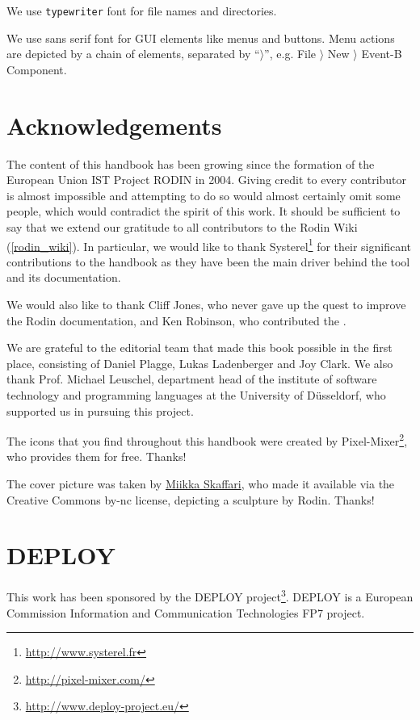 \documentclass[12pt]{book}
\begin{document}
We use \texttt{typewriter} font for file names and directories.

We use \textsf{sans serif font} for GUI elements like menus and buttons.  Menu actions are depicted by a chain of elements, separated by ``$\rangle$'', e.g. \textsf{File $\rangle$ New $\rangle$ Event-B Component}.

\section{Acknowledgements}
\label{sec:acknowledgements}

The content of this handbook has been growing since the formation of the European Union IST Project RODIN in 2004.  Giving credit to every contributor is almost impossible and attempting to do so would almost certainly omit some people, which would contradict the spirit of this work.  It should be sufficient to say that we extend our gratitude to all contributors to the Rodin Wiki (\ref{rodin_wiki}). In particular, we would like to thank Systerel\footnote{\url{http://www.systerel.fr}} for their significant contributions to the handbook as they have been the main driver behind the tool and its documentation.

We would also like to thank Cliff Jones, who never gave up the quest to improve the Rodin documentation, and Ken Robinson, who contributed the .

We are grateful to the editorial team that made this book possible in the first place, consisting of Daniel Plagge, Lukas Ladenberger and Joy Clark.  We also thank Prof. Michael Leuschel, department head of the institute of software technology and programming languages at the University of Düsseldorf, who supported us in pursuing this project.

The icons that you find throughout this handbook were created by Pixel-Mixer\footnote{\url{http://pixel-mixer.com/}}, who provides them for free.  Thanks!

The cover picture was taken by \href{http://www.skaffari.fi/}{Miikka Skaffari}, who made it available via the Creative Commons by-nc license, depicting a sculpture by Rodin.  Thanks!

\section{DEPLOY}
\label{deploy}

This work has been sponsored by the DEPLOY project\footnote{\url{http://www.deploy-project.eu/}}.  DEPLOY is a European Commission Information and Communication Technologies FP7 project.
\end{document}
